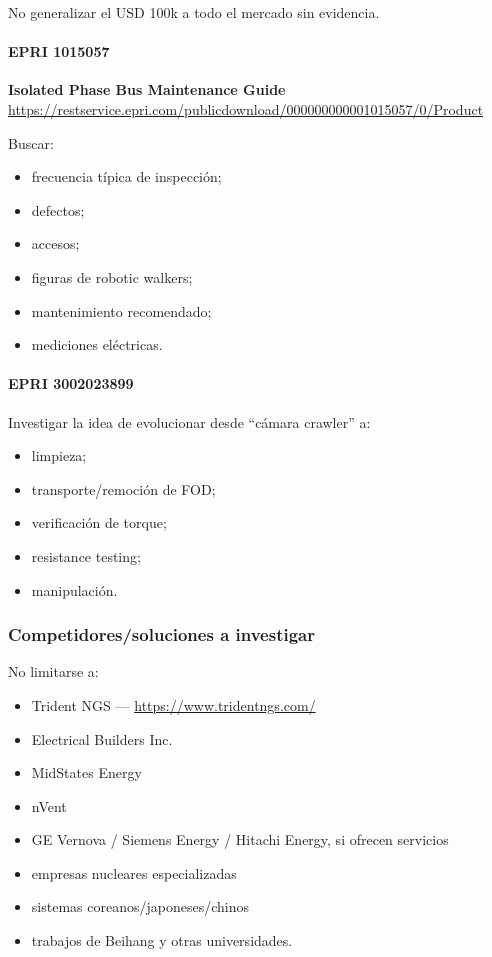 \documentclass[11pt,a4paper]{article}
\begin{document}
No generalizar el USD 100k a todo el mercado sin evidencia.


\paragraph*{EPRI 1015057}
\textbf{Isolated Phase Bus Maintenance Guide} \\
\url{https://restservice.epri.com/publicdownload/000000000001015057/0/Product}

Buscar:

\begin{itemize}
\item frecuencia típica de inspección;
\item defectos;
\item accesos;
\item figuras de robotic walkers;
\item mantenimiento recomendado;
\item mediciones eléctricas.
\end{itemize}


\paragraph*{EPRI 3002023899}
Investigar la idea de evolucionar desde ``cámara crawler'' a:

\begin{itemize}
\item limpieza;
\item transporte/remoción de FOD;
\item verificación de torque;
\item resistance testing;
\item manipulación.
\end{itemize}


\subsubsection*{Competidores/soluciones a investigar}
No limitarse a:

\begin{itemize}
\item Trident NGS — \url{https://www.tridentngs.com/}
\item Electrical Builders Inc.
\item MidStates Energy
\item nVent
\item GE Vernova / Siemens Energy / Hitachi Energy, si ofrecen servicios
\item empresas nucleares especializadas
\item sistemas coreanos/japoneses/chinos
\item trabajos de Beihang y otras universidades.
\end{itemize}
\end{document}
